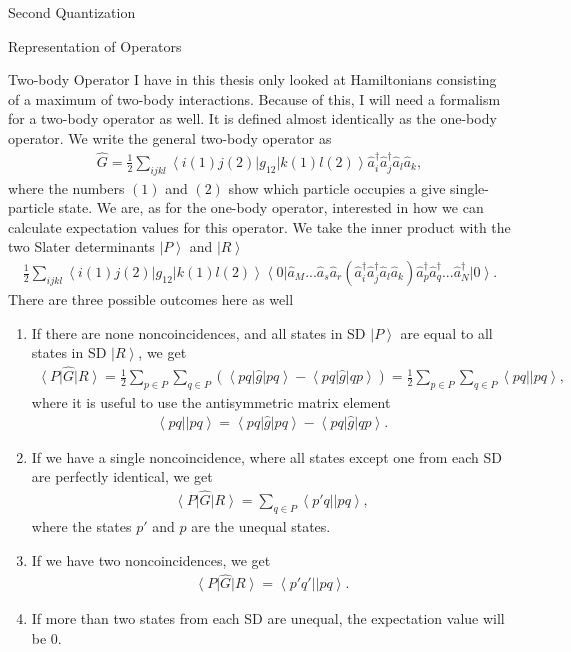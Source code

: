 \documentclass[twoside,english]{uiofysmaster}
\begin{document}
\begin{chapter}{Second Quantization}
\begin{section}{Representation of Operators}
		\begin{subsection}{Two-body Operator}
			I have in this thesis only looked at Hamiltonians consisting of a maximum of two-body interactions. Because of this, I will need a formalism for a two-body operator as well. It is defined almost identically as the one-body operator. We write the general two-body operator as
			\begin{align}
				\hat G = \frac{1}{2} \sum_{ijkl} \left< i(1) j(2) \right| g_{12} \left| k(1) l(2) \right> \hat a_i^\dagger \hat a_j^\dagger \hat a_l \hat a_k,
			\end{align}
			where the numbers $(1)$ and $(2)$ show which particle occupies a give single-particle state. We are, as for the one-body operator, interested in how we can calculate expectation values for this operator. We take the inner product with the two Slater determinants $\left| P \right>$ and $\left| R\right>$
			\begin{align}
				\frac{1}{2} \sum_{ijkl} \left< i(1) j(2) \right| g_{12} \left| k(1) l(2) \right>   \left< 0 \right| \hat a_M ... \hat a_s \hat a_r (\hat a_i^\dagger \hat a_j^\dagger \hat a_l \hat a_k) \hat a_p^\dagger \hat a_q^\dagger ... \hat a_N^\dagger \left| 0 \right>.
			\end{align}
			There are three possible outcomes here as well 
			\begin{enumerate}
				\item If there are none noncoincidences, and all states in SD $\left| P \right>$ are equal to all states in SD $\left| R \right>$, we get 
				\begin{align}
				 	\left< P \right| \hat G \left| R \right> = \frac{1}{2}\sum_{p \in P}\sum_{q \in P} (\left< pq\right| \hat g \left| pq \right> - \left< pq\right| \hat g \left| qp \right> ) = \frac{1}{2}\sum_{p \in P}\sum_{q \in P} \left< pq || pq \right>,
				\end{align}
				where it is useful to use the antisymmetric matrix element
				\begin{align}
					\left< pq || pq \right> = \left< pq\right| \hat g \left| pq \right> - \left< pq\right| \hat g \left| qp \right>.
				\end{align}
				\item If we have a single noncoincidence, where all states except one from each SD are perfectly identical, we get \cite{ShavittAndBartlett}
				\begin{align}
					\left< P \right| \hat G \left| R \right> = \sum_{q \in P} \left< p' q || p q \right>,
				\end{align}
				where the states $p'$ and $p$ are the unequal states. 
				\item If we have two noncoincidences, we get 
				\begin{align}
					\left< P \right| \hat G \left| R \right> = \left< p' q' || p q \right> .
				\end{align}
				\item If more than two states from each SD are unequal, the expectation value will be $0$.
			\end{enumerate}
		\end{subsection}


\end{section}
\end{chapter}
\end{document}

